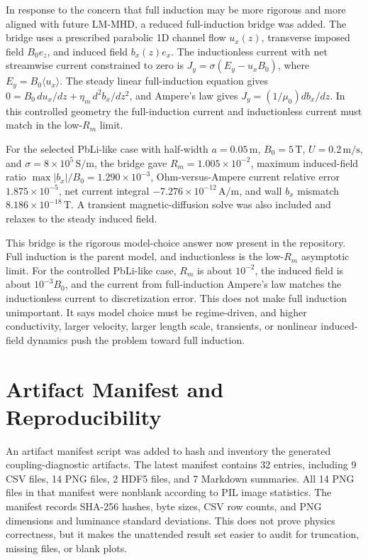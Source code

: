 \documentclass[11pt]{article}
\begin{document}
In response to the concern that full induction may be more rigorous and more aligned with future LM-MHD, a reduced full-induction bridge was added. The bridge uses a prescribed parabolic 1D channel flow \(u_x(z)\), transverse imposed field \(B_0 e_z\), and induced field \(b_x(z)e_x\). The inductionless current with net streamwise current constrained to zero is \(J_y=\sigma(E_y-u_xB_0)\), where \(E_y=B_0\langle u_x\rangle\). The steady linear full-induction equation gives \(0=B_0\,du_x/dz+\eta_m\,d^2b_x/dz^2\), and Ampere's law gives \(J_y=(1/\mu_0)db_x/dz\). In this controlled geometry the full-induction current and inductionless current must match in the low-\(R_m\) limit.

For the selected PbLi-like case with half-width \(a=0.05\,\mathrm{m}\), \(B_0=5\,\mathrm{T}\), \(U=0.2\,\mathrm{m/s}\), and \(\sigma=8\times10^5\,\mathrm{S/m}\), the bridge gave \(R_m=1.005\times10^{-2}\), maximum induced-field ratio \(\max |b_x|/B_0=1.290\times10^{-3}\), Ohm-versus-Ampere current relative error \(1.875\times10^{-5}\), net current integral \(-7.276\times10^{-12}\,\mathrm{A/m}\), and wall \(b_x\) mismatch \(8.186\times10^{-18}\,\mathrm{T}\). A transient magnetic-diffusion solve was also included and relaxes to the steady induced field.

This bridge is the rigorous model-choice answer now present in the repository. Full induction is the parent model, and inductionless is the low-\(R_m\) asymptotic limit. For the controlled PbLi-like case, \(R_m\) is about \(10^{-2}\), the induced field is about \(10^{-3}B_0\), and the current from full-induction Ampere's law matches the inductionless current to discretization error. This does not make full induction unimportant. It says model choice must be regime-driven, and higher conductivity, larger velocity, larger length scale, transients, or nonlinear induced-field dynamics push the problem toward full induction.

\section{Artifact Manifest and Reproducibility}

An artifact manifest script was added to hash and inventory the generated coupling-diagnostic artifacts. The latest manifest contains 32 entries, including 9 CSV files, 14 PNG files, 2 HDF5 files, and 7 Markdown summaries. All 14 PNG files in that manifest were nonblank according to PIL image statistics. The manifest records SHA-256 hashes, byte sizes, CSV row counts, and PNG dimensions and luminance standard deviations. This does not prove physics correctness, but it makes the unattended result set easier to audit for truncation, missing files, or blank plots.
\end{document}
